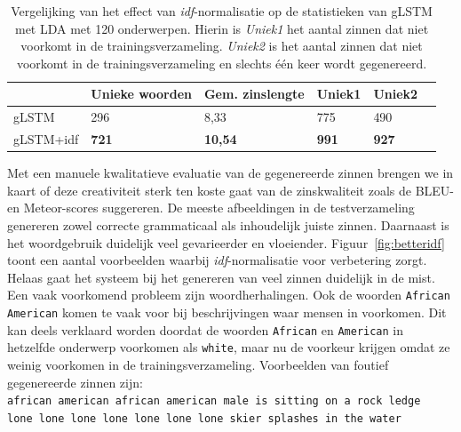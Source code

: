     \begin{table}
    	\centering
    	\begin{tabular}{llllll}
    		~                   & Unieke woorden & Gem. zinslengte & Uniek1 & Uniek2 \\ \hline
    		gLSTM         				  & 296   & 8,33   & 775   & 490  \\
    		
    		gLSTM+idf 				  & \textbf{721}   & \textbf{10,54}   & \textbf{991}   & \textbf{927}    \\\hline
    	\end{tabular}
    	\caption[Vergelijking effect \emph{idf}-normalisatie op de statistieken van gLSTM met LDA met 120 onderwerpen]{Vergelijking van het effect van \emph{idf}-normalisatie op de statistieken van gLSTM met LDA met 120 onderwerpen. Hierin is \emph{Uniek1} het aantal zinnen dat niet voorkomt in de trainingsverzameling. \emph{Uniek2} is het aantal zinnen dat niet voorkomt in de trainingsverzameling en slechts \'e\'en keer wordt gegenereerd.}
    	\label{table:idf-stats}
    \end{table}
    
Met een manuele kwalitatieve evaluatie van de gegenereerde zinnen brengen we in kaart of deze creativiteit sterk ten koste gaat van de zinskwaliteit zoals de BLEU- en Meteor-scores suggereren. 
De meeste afbeeldingen in de testverzameling genereren zowel correcte grammaticaal als inhoudelijk juiste zinnen.
Daarnaast is het woordgebruik duidelijk veel gevarieerder en vloeiender.
Figuur~\ref{fig:betteridf} toont een aantal voorbeelden waarbij \emph{idf}-normalisatie voor verbetering zorgt.
Helaas gaat het systeem bij het genereren van veel zinnen duidelijk in de mist. Een vaak voorkomend probleem zijn woordherhalingen. Ook de woorden \texttt{African American} komen te vaak voor bij beschrijvingen waar mensen in voorkomen. Dit kan deels verklaard worden doordat de woorden \texttt{African} en \texttt{American} in hetzelfde onderwerp voorkomen als \texttt{white}, maar nu de voorkeur krijgen omdat ze weinig voorkomen in de trainingsverzameling. Voorbeelden van foutief gegenereerde zinnen zijn:\\
\texttt{african american african american male is sitting on a rock ledge}\\
\texttt{lone lone lone lone lone lone lone skier splashes in the water}

